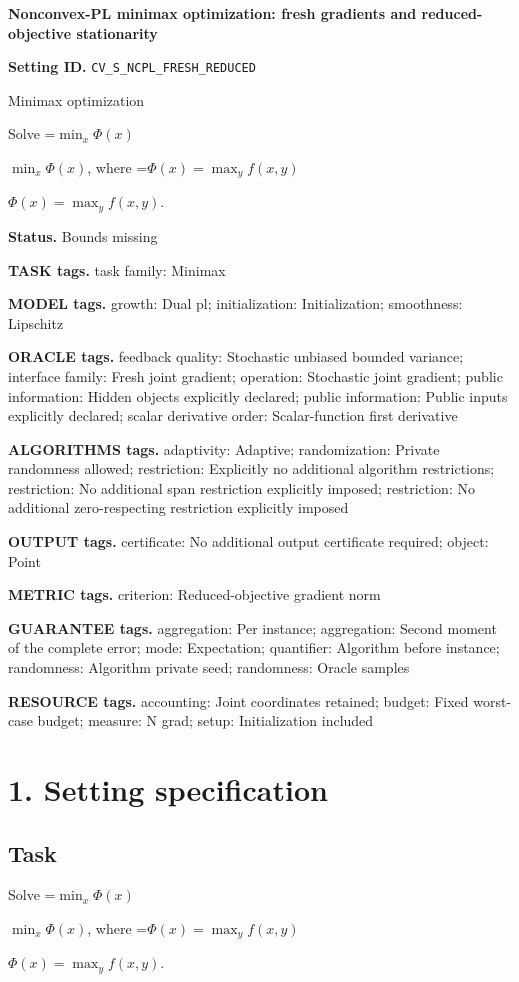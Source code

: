 \documentclass[10pt,a4paper]{article}
\newcommand{\AtlasMath}[1]{\par\begingroup\centering\setbox0=\hbox{$\displaystyle #1$}\ifdim\wd0>1.4\linewidth\typeout{ATLAS WIDE FORMULA: \the\wd0}\fi\ifdim\wd0>\linewidth\resizebox{\linewidth}{!}{\box0}\else\box0\fi\par\endgroup}
\newcommand{\AtlasInlineMath}[1]{\begingroup\setbox0=\hbox{$#1$}\ifdim\wd0>.4\linewidth\endgroup\AtlasMath{#1}\else\endgroup$#1$\fi}
\begin{document}
\raggedright

{\LARGE\bfseries\sffamily\color{AtlasNavy} Nonconvex-PL minimax optimization: fresh gradients and reduced-objective stationarity\par}\vspace{5pt}
\textbf{Setting ID.} \texttt{CV\_\allowbreak{}S\_\allowbreak{}NCPL\_\allowbreak{}FRESH\_\allowbreak{}REDUCED}

Minimax optimization

Solve \AtlasInlineMath{\min_x\Phi(x)}, where \AtlasInlineMath{\Phi(x)=\max_yf(x,y)}.

\textbf{Status.} Bounds missing

\textbf{TASK tags.} task family: Minimax

\textbf{MODEL tags.} growth: Dual pl; initialization: Initialization; smoothness: Lipschitz

\textbf{ORACLE tags.} feedback quality: Stochastic unbiased bounded variance; interface family: Fresh joint gradient; operation: Stochastic joint gradient; public information: Hidden objects explicitly declared; public information: Public inputs explicitly declared; scalar derivative order: Scalar-function first derivative

\textbf{ALGORITHMS tags.} adaptivity: Adaptive; randomization: Private randomness allowed; restriction: Explicitly no additional algorithm restrictions; restriction: No additional span restriction explicitly imposed; restriction: No additional zero-respecting restriction explicitly imposed

\textbf{OUTPUT tags.} certificate: No additional output certificate required; object: Point

\textbf{METRIC tags.} criterion: Reduced-objective gradient norm

\textbf{GUARANTEE tags.} aggregation: Per instance; aggregation: Second moment of the complete error; mode: Expectation; quantifier: Algorithm before instance; randomness: Algorithm private seed; randomness: Oracle samples

\textbf{RESOURCE tags.} accounting: Joint coordinates retained; budget: Fixed worst-case budget; measure: N grad; setup: Initialization included

\section{1. Setting specification}
\subsection{Task}
Solve \AtlasInlineMath{\min_x\Phi(x)}, where \AtlasInlineMath{\Phi(x)=\max_yf(x,y)}.
\end{document}
